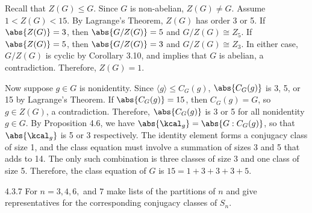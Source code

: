 \begin{sol}
	Recall that $Z(G) \leq G$.
	Since $G$ is non-abelian, $Z(G) \neq G$.
	Assume $1 < Z(G) < 15$.
	By Lagrange's Theorem, $Z(G)$ has order 3 or 5.
	If $\abs{Z(G)} = 3$, then $\abs{G/Z(G)} = 5$ and $G/Z(G) \cong Z_5$.
	If $\abs{Z(G)} = 5$, then $\abs{G/Z(G)} = 3$ and $G/Z(G) \cong Z_3$.
	In either case, $G/Z(G)$ is cyclic by Corollary 3.10, and  implies that $G$ is abelian, a contradiction.
	Therefore, $Z(G) = 1$.

	Now suppose $g \in G$ is nonidentity.
	Since $\langle g \rangle \leq C_G(g)$, $\abs{C_G(g)}$ is 3, 5, or 15 by Lagrange's Theorem.
	If $\abs{C_G(g)} = 15$, then $C_G(g) = G$, so $g \in Z(G)$, a contradiction.
	Therefore, $\abs{C_G(g)}$ is 3 or 5 for all nonidentity $g \in G$.
	By Proposition 4.6, we have $\abs{\kcal_g} = \abs{G : C_G(g)}$, so that $\abs{\kcal_g}$ is 5 or 3 respectively.
	The identity element forms a conjugacy class of size 1, and the class equation must involve a summation of sizes 3 and 5 that adds to 14.
	The only such combination is three classes of size 3 and one class of size 5.
	Therefore, the class equation of $G$ is $15 = 1 + 3 + 3 + 3 + 5$.
\end{sol}

\begin{exercise}{4.3.7}
	For $n=3,4,6,$ and $7$ make lists of the partitions of $n$ and give representatives for the corresponding conjugacy classes of $S_n$.
\end{exercise}

